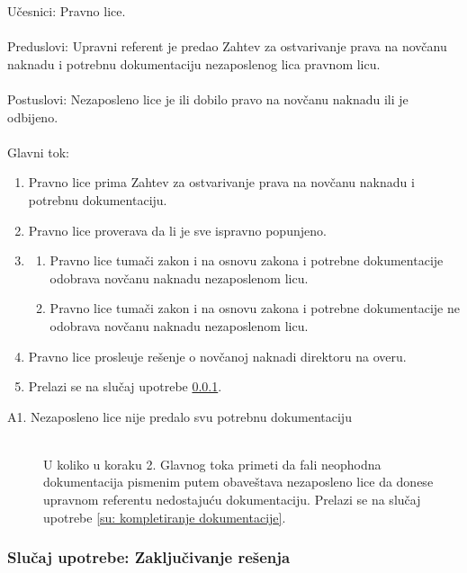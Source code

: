 \noindent U\v cesnici: Pravno lice.
\\
\\ Preduslovi: Upravni referent je predao Zahtev za ostvarivanje prava na nov\v canu naknadu i potrebnu dokumentaciju nezaposlenog lica pravnom licu.
\\
\\ Postuslovi: Nezaposleno lice je ili dobilo pravo na nov\v canu naknadu ili je odbijeno.
\\
\\ Glavni tok:
\begin{enumerate}
\item Pravno lice prima Zahtev za ostvarivanje prava na nov\v canu naknadu i potrebnu dokumentaciju.
\item Pravno lice proverava da li je sve ispravno popunjeno.
\item \begin{enumerate}
\item Pravno lice tuma\v ci zakon i na osnovu zakona i potrebne dokumentacije odobrava nov\v canu naknadu nezaposlenom licu.
\item Pravno lice tuma\v ci zakon i na osnovu zakona i potrebne dokumentacije ne odobrava nov\v canu naknadu nezaposlenom licu.
\end{enumerate}
\item Pravno lice prosle\dj uje re\v senje o nov\v canoj naknadi direktoru na overu.
\item Prelazi se na slu\v caj upotrebe \ref{su: gde je pecat}.
\end{enumerate}

\begin{description}
\item [A1. Nezaposleno lice nije predalo svu potrebnu dokumentaciju] ~\\
	U koliko u koraku 2. Glavnog toka primeti da fali neophodna dokumentacija pismenim putem obave\v stava nezaposleno lice da donese upravnom referentu nedostaju\' cu dokumentaciju. Prelazi se na slu\v caj upotrebe \ref{su: kompletiranje dokumentacije}.
\end{description}


\subsubsection{Slu\v caj upotrebe: Zaklju\v civanje re\v senja}
\label{su: gde je pecat}

